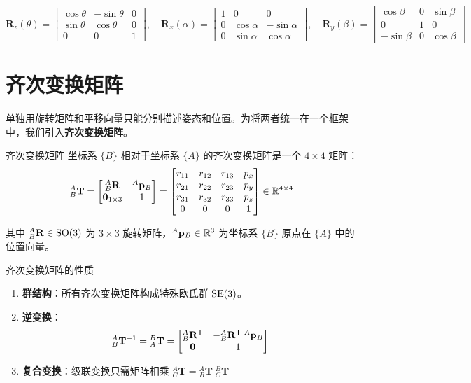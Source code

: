 \[
\mathbf{R}_z(\theta) = \begin{bmatrix}
	\cos\theta & -\sin\theta & 0 \\
	\sin\theta &  \cos\theta & 0 \\
	0          &  0          & 1
\end{bmatrix}, \quad
\mathbf{R}_x(\alpha) = \begin{bmatrix}
	1 & 0         & 0          \\
	0 & \cos\alpha & -\sin\alpha \\
	0 & \sin\alpha &  \cos\alpha
\end{bmatrix}, \quad
\mathbf{R}_y(\beta) = \begin{bmatrix}
	 \cos\beta & 0 & \sin\beta \\
	 0         & 1 & 0         \\
	-\sin\beta & 0 & \cos\beta
\end{bmatrix}
\]

\section{齐次变换矩阵}

单独用旋转矩阵和平移向量只能分别描述姿态和位置。为将两者统一在一个框架中，我们引入\textbf{齐次变换矩阵}。

\begin{mydefinition}{齐次变换矩阵}
	坐标系 $\{B\}$ 相对于坐标系 $\{A\}$ 的齐次变换矩阵是一个 $4 \times 4$ 矩阵：
	\[
	{}^{A}_{B}\mathbf{T} = \begin{bmatrix}
		{}^{A}_{B}\mathbf{R} & {}^{A}\mathbf{p}_{B} \\
		\mathbf{0}_{1\times 3} & 1
	\end{bmatrix} = \begin{bmatrix}
		r_{11} & r_{12} & r_{13} & p_x \\
		r_{21} & r_{22} & r_{23} & p_y \\
		r_{31} & r_{32} & r_{33} & p_z \\
		0      & 0      & 0      & 1
	\end{bmatrix} \in \mathbb{R}^{4\times 4}
	\]
\end{mydefinition}

其中 ${}^{A}_{B}\mathbf{R} \in \mathrm{SO}(3)$ 为 $3\times3$ 旋转矩阵，${}^{A}\mathbf{p}_{B} \in \mathbb{R}^{3}$ 为坐标系 $\{B\}$ 原点在 $\{A\}$ 中的位置向量。

\begin{myTheorem}{齐次变换矩阵的性质}
	\begin{enumerate}
		\item \textbf{群结构}：所有齐次变换矩阵构成特殊欧氏群 $\mathrm{SE}(3)$。
		\item \textbf{逆变换}：
		\[
		{}^{A}_{B}\mathbf{T}^{-1} = {}^{B}_{A}\mathbf{T} = \begin{bmatrix}
			{}^{A}_{B}\mathbf{R}^{\mathsf{T}} & -{}^{A}_{B}\mathbf{R}^{\mathsf{T}} \; {}^{A}\mathbf{p}_{B} \\
			\mathbf{0} & 1
		\end{bmatrix}
		\]
		\item \textbf{复合变换}：级联变换只需矩阵相乘 ${}^{A}_{C}\mathbf{T} = {}^{A}_{B}\mathbf{T} \; {}^{B}_{C}\mathbf{T}$
	\end{enumerate}
\end{myTheorem}

